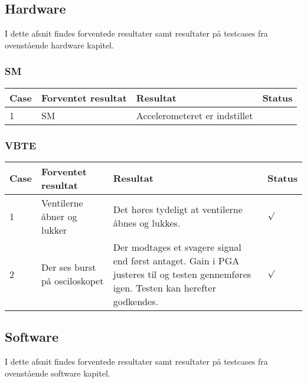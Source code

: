 \subsection{Hardware}
I dette afsnit findes forventede resultater samt resultater på testcases fra ovenstående hardware kapitel.\\
\subsubsection{SM}
\begin{table}[H]
\centering
\begin{tabular}{| p{1.5cm}  | p{4cm} | p{6cm} | p{1cm} |}
\hline
Case &Forventet resultat &Resultat &Status\\\hline
1 &SM &Accelerometeret er indstillet & \\\hline
 
\end{tabular}
\end{table}
\subsubsection{VBTE}
\begin{table}[H]
\centering
\begin{tabular}{| p{1.5cm}  | p{4cm} | p{6cm} | p{1cm} |}
\hline
Case &Forventet resultat &Resultat &Status\\\hline
1 &Ventilerne åbner og lukker &Det høres tydeligt at ventilerne åbnes og lukkes. &\begin{Huge}$\surd$\end{Huge} \\\hline 
2 &Der ses burst på osciloskopet &Der modtages et svagere signal end først antaget. Gain i PGA justeres til og testen gennemføres igen. Testen kan herefter godkendes. &\begin{Huge}$\surd$\end{Huge} \\\hline 
\end{tabular}
\end{table}
\subsection{Software}
I dette afsnit findes forventede resultater samt resultater på testcases fra ovenstående software kapitel.\\
